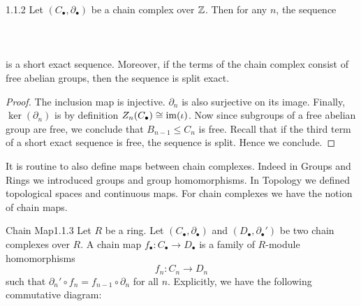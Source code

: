 \documentclass[a4paper]{article}
\begin{document}
\begin{lmm}{}{1.1.2} Let $(C_\bullet,\partial_\bullet)$ be a chain complex over $\mathbb{Z}$. Then for any $n$, the sequence \\~\\
\\~\\
is a short exact sequence. Moreover, if the terms of the chain complex consist of free abelian groups, then the sequence is split exact. \tcbline
\begin{proof}
The inclusion map is injective. $\partial_n$ is also surjective on its image. Finally, $\ker(\partial_n)$ is by definition $Z_n(C_\bullet)\cong\operatorname{im}(\iota)$. Now since subgroups of a free abelian group are free, we conclude that $B_{n-1}\leq C_n$ is free. Recall that if the third term of a short exact sequence is free, the sequence is split. Hence we conclude. 
\end{proof}
\end{lmm}

It is routine to also define maps between chain complexes. Indeed in Groups and Rings we introduced groups and group homomorphisms. In Topology we defined topological spaces and continuous maps. For chain complexes we have the notion of chain maps. 

\begin{defn}{Chain Map}{1.1.3} Let $R$ be a ring. Let $(C_\bullet,\partial_\bullet)$ and $(D_\bullet,\partial_\bullet')$ be two chain complexes over $R$. A chain map $f_\bullet:C_\bullet\to D_\bullet$ is a family of $R$-module homomorphisms $$f_n:C_n\to D_n$$ such that $\partial_n'\circ f_n=f_{n-1}\circ\partial_n$ for all $n$. Explicitly, we have the following commutative diagram: \\~\\
\end{defn}
\end{document}
